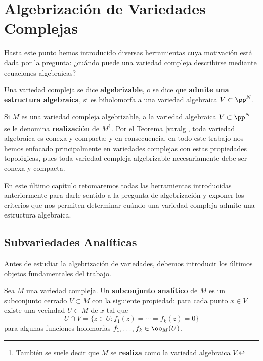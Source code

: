 \chapter{Algebrización de Variedades Complejas}

	Hasta este punto hemos introducido diversas herramientas cuya motivación está dada por la pregunta: ¿cuándo puede una variedad compleja describirse mediante ecuaciones algebraicas?
	
	\begin{definition}
		Una variedad compleja se dice \textbf{algebrizable}, o se dice que \textbf{admite una estructura algebraica}, si es biholomorfa a una variedad algebraica $V\subset \pp^N$.
	\end{definition}
	
	Si $M$ es una variedad compleja algebrizable, a la variedad algebraica $V\subset \pp^N$ se le denomina \textbf{realización} de $M$\footnote{También se suele decir que $M$ se \textbf{realiza} como la variedad algebraica $V$.}. Por el Teorema \ref{varalg}, toda variedad algebraica es conexa y compacta; y en consecuencia, en todo este trabajo nos hemos enfocado principalmente en variedades complejas con estas propiedades topológicas, pues toda variedad compleja algebrizable necesariamente debe ser conexa y compacta.
	
	En este último capítulo retomaremos todas las herramientas introducidas anteriormente para darle sentido a la pregunta de algebrización y exponer los criterios que nos permiten determinar cuándo una variedad compleja admite una estructura algebraica.

    \section{Subvariedades Analíticas}
    
    Antes de estudiar la algebrización de variedades, debemos introducir los últimos objetos fundamentales del trabajo.
    
    \begin{definition}
    	Sea $M$ una variedad compleja. Un \textbf{subconjunto analítico} de $M$ es un subconjunto cerrado $V\subset M$ con la siguiente propiedad: para cada punto $x\in V$ existe una vecindad $U\subset M$ de $x$ tal que
    	\begin{equation*}
    		U\cap V=\{z\in U:f_1(z)=\cdots=f_k(z)=0\}
    	\end{equation*}  
    	para algunas funciones holomorfas $f_1,\dots,f_k\in\oo_M(U)$.
    \end{definition}
    
